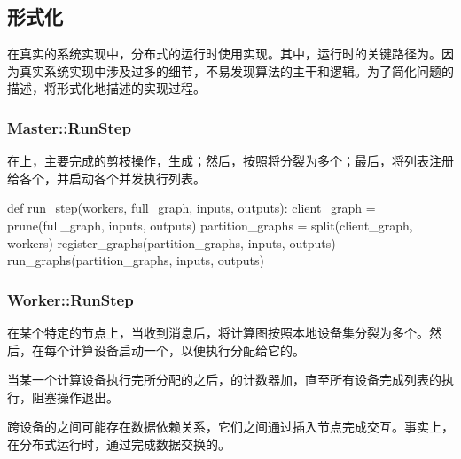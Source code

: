 \begin{content}
\subsection{形式化}

在真实的系统实现中，分布式的运行时使用实现。其中，\tf{}运行时的关键路径为。因为真实系统实现中涉及过多的细节，不易发现算法的主干和逻辑。为了简化问题的描述，将形式化地描述的实现过程。

\subsubsection{Master::RunStep}

在上，主要完成的剪枝操作，生成；然后，按照将分裂为多个；最后，将列表注册给各个，并启动各个并发执行列表。

\begin{leftbar}
\begin{python}
def run_step(workers, full_graph, inputs, outputs):
  client_graph = prune(full_graph, inputs, outputs)
  partition_graphs = split(client_graph, workers)
  register_graphs(partition_graphs, inputs, outputs)
  run_graphs(partition_graphs, inputs, outputs)
\end{python}
\end{leftbar}

\subsubsection{Worker::RunStep}

在某个特定的节点上，当收到消息后，将计算图按照本地设备集分裂为多个。然后，在每个计算设备启动一个，以便执行分配给它的。

当某一个计算设备执行完所分配的之后，的计数器加，直至所有设备完成列表的执行，阻塞操作退出。

跨设备的之间可能存在数据依赖关系，它们之间通过插入节点完成交互。事实上，在分布式运行时，通过完成数据交换的。



\end{content}
